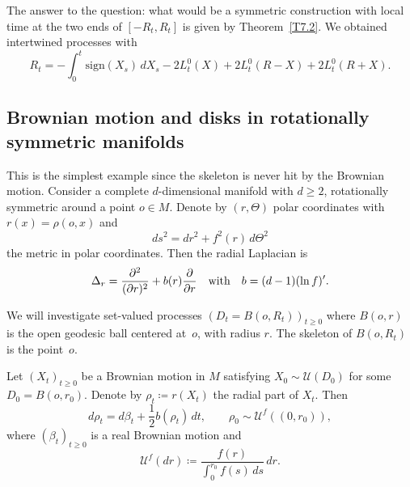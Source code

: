 \documentclass[10pt]{amsart}
\theoremstyle{plain}
\theoremstyle{definition}
\newcommand{\SU}{{\mathscr U}}
\newcommand\df{\coloneqq}
\newcommand{\sign}{\mathrm{sign}}
\let\f\frac
\let\b\beta
\begin{document}
The answer to the question: what would be a symmetric construction with local time at the two ends of $[-R_t,R_t]$ is given by Theorem~\ref{T7.2}. We obtained intertwined processes with
\begin{equation}
R_t=-\int_0^t\sign(X_s)\,dX_s-2L_t^0(X)+2L_t^0(R-X)+2L_t^0(R+X).
\end{equation}

\subsection{Brownian motion and disks in rotationally symmetric manifolds}
\label{Subsection5.2}
This is the simplest example since the skeleton is never hit by the Brownian motion. Consider a complete $d$-dimensional manifold with $d\ge 2$, rotationally symmetric around a point $o\in M$. Denote by $(r,\Theta)$ polar coordinates with $r(x)=\rho(o,x)$ and
\begin{equation}
ds^2=dr^2+f^2(r)\,d\Theta^2
\end{equation}
the metric in polar coordinates. Then the radial Laplacian is
\begin{equation}
\Delta_r=\f{\partial^2}{(\partial r)^2} +b(r)\f{\partial}{\partial r}\quad\hbox{with}\quad b=(d-1)(\ln f)'.
\end{equation}

We will investigate set-valued processes $(D_t=B(o,R_t))_{t\ge0}$ where $B(o,r)$ is the open geodesic ball centered at~$o$, with radius $r$. The skeleton of $B(o,R_t)$ is the point~$o$.

Let $(X_t)_{t\ge0}$ be a Brownian motion in $M$ satisfying $X_0\sim \SU(D_0)$ for some $D_0=B(o,r_0)$. Denote by $\rho_t\df r(X_t)$ the radial part of $X_t$. Then
\begin{equation}
d\rho_t=d\b_t+\f12 b(\rho_t)\,dt, \qquad \rho_0\sim \SU^f((0,r_0)),
\end{equation}
where $(\b_t)_{t\geq 0}$ is a real Brownian motion and
\begin{equation}
\SU^f(dr)\df \f{f(r)}{\int_0^{r_0}f(s)\,ds}\,dr.
\end{equation}
\end{document}
